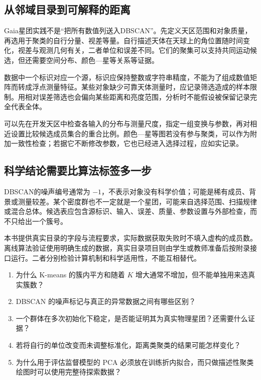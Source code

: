 
\subsection{从邻域目录到可解释的距离}
Gaia星团实践不是“把所有数值列送入DBSCAN”。先定义天区范围和对象质量，再选用于聚类的自行分量、视差等量。自行描述天体在天球上的角位置随时间变化，视差与观测几何有关，二者单位和误差不同。它们的聚集可以支持共同运动候选，但还需要空间分布、颜色—星等关系等证据。

数据中一个标识对应一个源，标识应保持整数或字符串精度，不能为了组成数值矩阵而转成浮点测量特征。某些对象缺少可靠天体测量时，应记录筛选造成的样本限制。用相对误差筛选也会偏向某些距离和亮度范围，分析时不能假设被保留记录完全代表全体。

可以先在开发天区中检查各输入的分布与测量尺度，指定一组变换与参数，再对相近设置比较候选成员集合的重合比例。颜色—星等图若没有参与聚类，可以作为附加一致性检查；若据它不断修改参数，它也已经进入选择过程，应如实记录。

\subsection{科学结论需要比算法标签多一步}
DBSCAN的噪声编号通常为 $-1$，不表示对象没有科学价值；可能是稀有成员、背景或测量较差。某个密度群也不一定就是一个星团，可能来自选择范围、扫描规律或混合总体。候选表应包含源标识、输入、误差、质量、参数设置与外部检查，而不只给出一个簇号。

本书提供真实目录的字段与流程要求，实际数据获取失败时不填入虚构的成员数。离线算法验证使用明确生成的数据，真实目录项目则由学生或教师准备后按附录接口运行。二者分别检验计算机制和科学适用性，不能互相替代。

\chapterexercise
\begin{enumerate}
\item 为什么 K-means 的簇内平方和随着 $K$ 增大通常不增加，但不能单独用来选真实簇数？
\item DBSCAN 的噪声标记与真正的异常数据之间有哪些区别？
\item 一个群体在多次初始化下稳定，是否能证明其为真实物理星团？还需要什么证据？
\item 若将自行的单位改变而未调整标准化，距离类聚类的结果可能怎样变化？
\item 为什么用于评估监督模型的 PCA 必须放在训练折内拟合，而只做描述性聚类绘图时可以使用完整待探索数据？
\end{enumerate}


